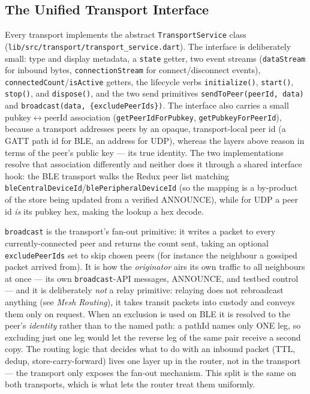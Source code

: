 \documentclass[11pt]{report}
\newcommand{\code}[1]{\texttt{\small #1}}
\begin{document}
\subsection{The Unified Transport Interface}

Every transport implements the abstract \code{TransportService} class (\code{lib/src/transport/transport_service.dart}). The interface is deliberately small: type and display metadata, a \code{state} getter, two event streams (\code{dataStream} for inbound bytes, \code{connectionStream} for connect/disconnect events), \code{connectedCount}/\code{isActive} getters, the lifecycle verbs \code{initialize()}, \code{start()}, \code{stop()}, and \code{dispose()}, and the two send primitives \code{sendToPeer(peerId, data)} and \code{broadcast(data, \{excludePeerIds\})}. The interface also carries a small pubkey$\leftrightarrow$peerId association (\code{getPeerIdForPubkey}, \code{getPubkeyForPeerId}), because a transport addresses peers by an opaque, transport-local peer id (a GATT path id for BLE, an address for UDP), whereas the layers above reason in terms of the peer's public key --- its true identity. The two implementations resolve that association differently and neither does it through a shared interface hook: the BLE transport walks the Redux peer list matching \code{bleCentralDeviceId}/\code{blePeripheralDeviceId} (so the mapping is a by-product of the store being updated from a verified ANNOUNCE), while for UDP a peer id \emph{is} its pubkey hex, making the lookup a hex decode.

\code{broadcast} is the transport's fan-out primitive: it writes a packet to every currently-connected peer and returns the count sent, taking an optional \code{excludePeerIds} set to skip chosen peers (for instance the neighbour a gossiped packet arrived from). It is how the \emph{originator} airs its own traffic to all neighbours at once --- its own \code{broadcast}-API messages, ANNOUNCE, and testbed control --- and it is deliberately \emph{not} a relay primitive: relaying does not rebroadcast anything (see \emph{Mesh Routing}), it takes transit packets into custody and conveys them only on request. When an exclusion is used on BLE it is resolved to the peer's \emph{identity} rather than to the named path: a pathId names only ONE leg, so excluding just one leg would let the reverse leg of the same pair receive a second copy. The routing logic that decides what to do with an inbound packet (TTL, dedup, store-carry-forward) lives one layer up in the router, not in the transport --- the transport only exposes the fan-out mechanism. This split is the same on both transports, which is what lets the router treat them uniformly.
\end{document}
